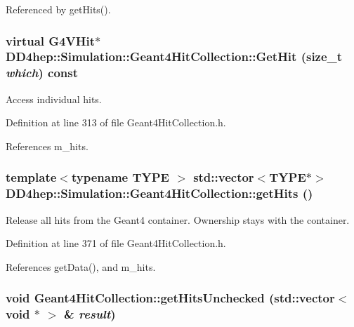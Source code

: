 Referenced by getHits().\hypertarget{class_d_d4hep_1_1_simulation_1_1_geant4_hit_collection_a43c7326636e5b90a2b114d0fb0696c83}{
\subsubsection[{GetHit}]{\setlength{\rightskip}{0pt plus 5cm}virtual {\bf G4VHit}$\ast$ DD4hep::Simulation::Geant4HitCollection::GetHit (size\_\-t {\em which}) const}}
\label{class_d_d4hep_1_1_simulation_1_1_geant4_hit_collection_a43c7326636e5b90a2b114d0fb0696c83}


Access individual hits. 

Definition at line 313 of file Geant4HitCollection.h.

References m\_\-hits.\hypertarget{class_d_d4hep_1_1_simulation_1_1_geant4_hit_collection_a89b8d192b634abba30bcebe231dbf43d}{
\subsubsection[{getHits}]{\setlength{\rightskip}{0pt plus 5cm}template$<$typename TYPE $>$ std::vector$<$TYPE$\ast$$>$ DD4hep::Simulation::Geant4HitCollection::getHits ()}}
\label{class_d_d4hep_1_1_simulation_1_1_geant4_hit_collection_a89b8d192b634abba30bcebe231dbf43d}


Release all hits from the Geant4 container. Ownership stays with the container. 

Definition at line 371 of file Geant4HitCollection.h.

References getData(), and m\_\-hits.\hypertarget{class_d_d4hep_1_1_simulation_1_1_geant4_hit_collection_a8faab9f1247e2d705da1c501c84197b5}{
\subsubsection[{getHitsUnchecked}]{\setlength{\rightskip}{0pt plus 5cm}void Geant4HitCollection::getHitsUnchecked (std::vector$<$ void $\ast$ $>$ \& {\em result})}}
\label{class_d_d4hep_1_1_simulation_1_1_geant4_hit_collection_a8faab9f1247e2d705da1c501c84197b5}


